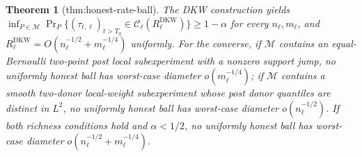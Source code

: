 \documentclass{article}
\newtheorem{theorem}{Theorem}
\begin{document}
\begin{theorem}[thm:honest-rate-ball]\label{thm:honest-rate-ball}
The DKW construction yields \(\inf_{P\in\mathcal M}\Pr_P\{(\tau_{t,\ell})_{t>T_0}\in\mathcal C_\ell(R^{\mathrm{DKW}}_\ell)\}\geq1-\alpha\) for every \(n_\ell,m_\ell\), and \(R^{\mathrm{DKW}}_\ell=O(n_\ell^{-1/2}+m_\ell^{-1/4})\) uniformly.  For the converse, if \(\mathcal M\) contains an equal-Bernoulli two-point post local subexperiment with a nonzero support jump, no uniformly honest ball has worst-case diameter \(o(m_\ell^{-1/4})\); if \(\mathcal M\) contains a smooth two-donor local-weight subexperiment whose post donor quantiles are distinct in \(L^2\), no uniformly honest ball has worst-case diameter \(o(n_\ell^{-1/2})\).  If both richness conditions hold and \(\alpha<1/2\), no uniformly honest ball has worst-case diameter \(o(n_\ell^{-1/2}+m_\ell^{-1/4})\).
\end{theorem}
\end{document}
